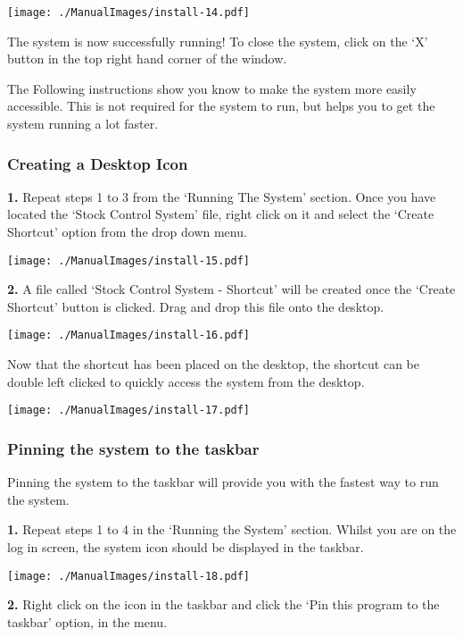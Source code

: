 \texttt{[image: ./ManualImages/install-14.pdf]}

The system is now successfully running! To close the system, click on the `X' button in the top right hand corner of the window.

\pagebreak

The Following instructions show you know to make the system more easily accessible. This is not required for the system to run, but helps you to get the system running a lot faster.

\subsubsection{Creating a Desktop Icon}

\textbf{1.} Repeat steps 1 to 3 from the `Running The System' section. Once you have located the `Stock Control System' file, right click on it and select the `Create Shortcut' option from the drop down menu.

\texttt{[image: ./ManualImages/install-15.pdf]}

\textbf{2.} A file called `Stock Control System - Shortcut' will be created once the `Create Shortcut' button is clicked. Drag and drop this file onto the desktop.

\texttt{[image: ./ManualImages/install-16.pdf]}

Now that the shortcut has been placed on the desktop, the shortcut can be double left clicked to quickly access the system from the desktop.

\texttt{[image: ./ManualImages/install-17.pdf]}

\subsubsection{Pinning the system to the taskbar}

Pinning the system to the taskbar will provide you with the fastest way to run the system.

\textbf{1.} Repeat steps 1 to 4 in the `Running the System' section. Whilst you are on the log in screen, the system icon should be displayed in the taskbar.

\texttt{[image: ./ManualImages/install-18.pdf]}

\textbf{2.} Right click on the icon in the taskbar and click the `Pin this program to the taskbar' option, in the menu.

